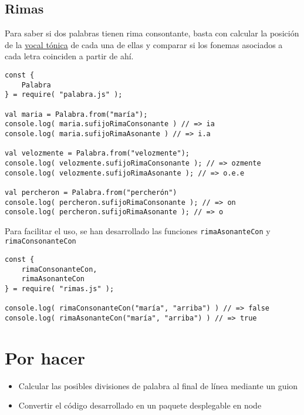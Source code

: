 \documentclass[11pt]{article}
\begin{document}
\subsection{Rimas}
\label{sec:org000002d}
Para saber si dos palabras tienen rima consontante, basta con calcular la posición de la \hyperref[vocal-tonica]{vocal tónica} de cada una de ellas y comparar si los fonemas asociados a cada letra coinciden a partir de ahí.


\lstset{language=typescript,label= ,caption= ,captionpos=b,numbers=none}
\begin{lstlisting}
const {
    Palabra
} = require( "palabra.js" );

val maria = Palabra.from("maría");
console.log( maria.sufijoRimaConsonante ) // => ia
console.log( maria.sufijoRimaAsonante ) // => i.a

val velozmente = Palabra.from("velozmente");
console.log( velozmente.sufijoRimaConsonante ); // => ozmente
console.log( velozmente.sufijoRimaAsonante ); // => o.e.e

val percheron = Palabra.from("percherón") 
console.log( percheron.sufijoRimaConsonante ); // => on
console.log( percheron.sufijoRimaAsonante ); // => o
\end{lstlisting}

Para facilitar el uso, se han desarrollado las funciones \texttt{rimaAsonanteCon} y \texttt{rimaConsonanteCon}


\lstset{language=typescript,label= ,caption= ,captionpos=b,numbers=none}
\begin{lstlisting}
const {
    rimaConsonanteCon,
    rimaAsonanteCon
} = require( "rimas.js" );

console.log( rimaConsonanteCon("maría", "arriba") ) // => false
console.log( rimaAsonanteCon("maría", "arriba") ) // => true
\end{lstlisting}

\section{Por hacer}
\label{sec:org0000033}
\begin{itemize}
\item Calcular las posibles divisiones de palabra al final de línea mediante un guion
\item Convertir el código desarrollado en un paquete desplegable en node
\end{itemize}
\end{document}
